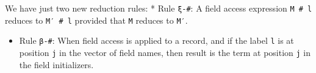 \begin{fence}
\begin{code}
\AgdaSpace{}%
\AgdaSpace{}%
\AgdaSpace{}%
\AgdaOperator{\AgdaInductiveConstructor{\#}}\AgdaSpace{}%
\<%
\\
%
\\[\AgdaEmptyExtraSkip]%
%
\>[2]\AgdaSpace{}%
\AgdaSymbol{:}\AgdaSpace{}%
\AgdaSpace{}%
\AgdaSymbol{\{}\AgdaSymbol{\}\{}\AgdaSpace{}%
\AgdaSymbol{:}\AgdaSpace{}%
\AgdaSpace{}%
\AgdaSpace{}%
\AgdaSymbol{\}\{}\AgdaSpace{}%
\AgdaSymbol{:}\AgdaSpace{}%
\AgdaSpace{}%
\AgdaSpace{}%
\AgdaSymbol{\}}\AgdaSpace{}%
\AgdaSymbol{\{}\AgdaSymbol{\}\{}\AgdaSpace{}%
\AgdaSymbol{:}\AgdaSpace{}%
\AgdaSpace{}%
\AgdaSymbol{\}}\<%
\\
\>[2][@{}l@{\AgdaIndent{0}}]%
\>[4]%
\>[1994I]\AgdaSpace{}%
\AgdaSpace{}%
\AgdaSpace{}%
\AgdaSpace{}%
\<%
\\
\>[.][@{}l@{}]\<[1994I]%
\>[6]\AgdaComment{---------------------------------}\<%
\\
%
\>[4]\AgdaSpace{}%
\AgdaSpace{}%
\AgdaSpace{}%
\AgdaOperator{\AgdaInductiveConstructor{:=}}\AgdaSpace{}%
\AgdaSpace{}%
\AgdaSpace{}%
\AgdaOperator{\AgdaInductiveConstructor{\#}}\AgdaSpace{}%
\AgdaSpace{}%
%
\>[27]\AgdaSpace{}%
\AgdaSpace{}%
\<%
\end{code}
\end{fence}

We have just two new reduction rules: * Rule \texttt{ξ-\#}: A field
access expression \texttt{M\ \#\ l} reduces to \texttt{M′\ \#\ l}
provided that \texttt{M} reduces to \texttt{M′}.

\begin{itemize}
\tightlist
\item
  Rule \texttt{β-\#}: When field access is applied to a record, and if
  the label \texttt{l} is at position \texttt{j} in the vector of field
  names, then result is the term at position \texttt{j} in the field
  initializers.
\end{itemize}


